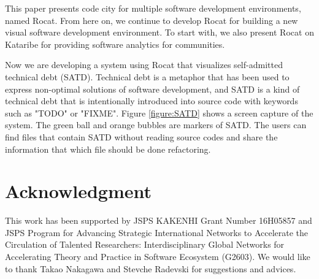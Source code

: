 \documentclass[conference]{IEEEtran}
\newcommand{\figref}[1]{Figure \ref{#1}}
\begin{document}
This paper presents code city for multiple software development environments, named Rocat.
From here on, we continue to develop Rocat for building a new visual software development environment.
To start with, we also present Rocat on Kataribe for providing software analytics for communities.

Now we are developing a system using Rocat that visualizes self-admitted technical debt (SATD).
Technical debt is a metaphor that has been used to express non-optimal solutions of software development, and SATD is a kind of technical debt that is intentionally introduced into source code with keywords such as "TODO" or "FIXME".
\figref{figure:SATD} shows a screen capture of the system.
The green ball and orange bubbles are markers of SATD.
The users can find files that contain SATD without reading source codes and share the information that which file should be done refactoring.


\section*{Acknowledgment}
This work has been supported by JSPS KAKENHI Grant Number 16H05857 and JSPS Program for Advancing Strategic International Networks to Accelerate the Circulation of Talented Researchers: Interdisciplinary Global Networks for Accelerating Theory and Practice in Software Ecosystem (G2603).
We would like to thank Takao Nakagawa and Stevche Radevski for suggestions and advices.





\end{document}
